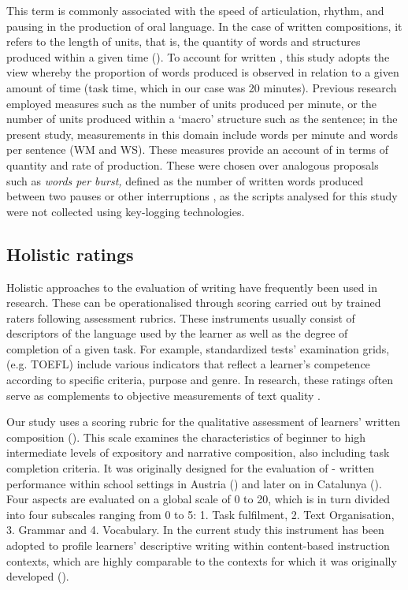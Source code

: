 \documentclass[output=paper]{langsci/langscibook}
\begin{document}
This term is commonly associated with the speed of articulation, rhythm, and pausing in the production of oral language. In the case of written compositions, it refers to the  length of units, that is, the quantity of words and structures produced within a given time (\citealt{BultéHousen2014}). To account for written , this study adopts the view whereby the proportion of words produced is observed in relation to a given amount of time (task time, which in our case was 20 minutes). Previous research employed measures such as the number of units produced per minute, or the number of units produced within a ‘macro’ structure such as the sentence; in the present study,  measurements in this domain include words per minute and words per sentence (WM and WS). These measures provide an account of  in terms of quantity and rate of production. These were chosen over analogous proposals such as \textit{words per burst,} defined as the number of written words produced between two pauses or other interruptions \citep{Gunnarsson2012}, as the scripts analysed for this study were not collected using key-logging technologies.

\subsection{Holistic ratings}

Holistic  approaches to the evaluation of  writing have frequently been used in  research. These can be operationalised through scoring carried out by trained raters following assessment rubrics. These instruments usually consist of descriptors of the language used by the learner as well as the degree of completion of a given task. For example, standardized tests’ examination grids, (e.g. TOEFL) include various indicators that reflect a learner's  competence according to specific criteria, purpose and genre. In  research, these ratings often serve as complements to objective measurements of text quality \citep{Weigle2002}.  

Our study uses a scoring rubric for the qualitative assessment of learners’ written composition (\citealt{FriedlAuer2007}). This scale examines the characteristics of beginner to high intermediate levels of expository and narrative composition, also including task completion criteria. It was originally designed for the evaluation of - written performance within  school settings in Austria (\citealt{FriedlAuer2007,Dalton-PufferEtAl2010}) and later on in Catalunya (\citealt{Juan-GarauSalazar-Noguera2015,RoquetPérez-Vidal2015}). Four aspects are evaluated on a global scale of 0 to 20, which is in turn divided into four subscales ranging from 0 to 5: 1. Task fulfilment, 2. Text Organisation, 3. Grammar and 4. Vocabulary.  In the current study this instrument has been adopted to profile learners’ descriptive writing within content-based instruction contexts, which are highly comparable to the contexts for which it was originally developed (\citealt{Pérez-Vidal2013}).
\end{document}
